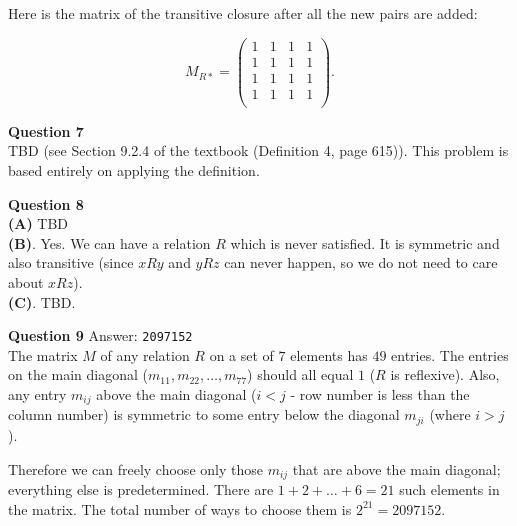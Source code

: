 \documentclass[jou]{apa6}
\begin{document}
Here is the matrix 
of the transitive closure after all the new pairs are added:

$$M_{R\ast}  = \left( \begin{array}{cccc}
1 & 1 & 1 & 1 \\
1 & 1 & 1 & 1 \\
1 & 1 & 1 & 1 \\
1 & 1 & 1 & 1 \\
\end{array} \right).$$



\vspace{6pt}
{\bf Question 7}\\
TBD (see Section 9.2.4 of the textbook (Definition 4, page 615)). This problem 
is based entirely on applying the definition.

\vspace{6pt}
{\bf Question 8}\\
{\bf (A)} TBD\\
{\bf (B)}. Yes. We can have a relation $R$ which is 
never satisfied. It is symmetric and also transitive
(since $xRy$ and $yRz$ can never happen, so we do not
need to care about $xRz$).\\
{\bf (C)}. TBD.


\vspace{6pt}
{\bf Question 9} Answer: {\tt 2097152}\\
The matrix $M$ of any relation $R$ on a set of $7$ elements has $49$ entries. 
The entries on the main diagonal ($m_{11},m_{22},\ldots,m_{77}$) 
should all equal $1$ ($R$ is reflexive). 
Also, any entry $m_{ij}$ above the main diagonal ($i<j$ - row number is
less than the column number) is symmetric to some entry below the diagonal
$m_{ji}$ (where $i>j$). 

Therefore we can freely choose only those $m_{ij}$ that are above the main 
diagonal; everything else is predetermined. There are $1+2+\ldots+6=21$ such 
elements in the matrix. The total number of ways to choose them is
$2^{21} = 2097152$.
\end{document}
